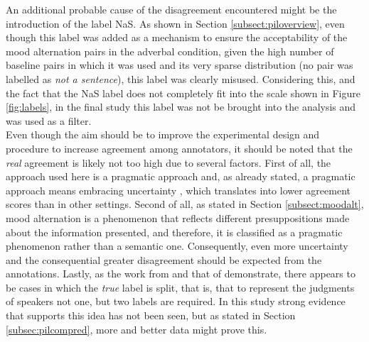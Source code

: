 An additional probable cause of the disagreement encountered might be the introduction of the label NaS. As shown in Section \ref{subsect:piloverview}, even though this label was added as a mechanism to ensure the acceptability of the mood alternation pairs in the adverbal condition, given the high number of baseline pairs in which it was used and its very sparse distribution (no pair was labelled as \textit{not a sentence}), this label was clearly misused. Considering this, and the fact that the NaS label does not completely fit into the scale shown in Figure \ref{fig:labels}, in the final study this label was not be brought into the analysis and was used as a filter.\\

Even though the aim should be to improve the experimental design and procedure to increase agreement among annotators, it should be noted that the \textit{real} agreement is likely not too high due to several factors. First of all, the approach used here is a pragmatic approach and, as already stated, a pragmatic approach means embracing uncertainty \citep{de2012did}, which translates into lower agreement scores than in other settings. Second of all, as stated in Section \ref{subsect:moodalt}, mood alternation is a phenomenon that reflects different presuppositions made about the information presented, and therefore, it is classified as a pragmatic phenomenon rather than a semantic one. Consequently, even more uncertainty and the consequential greater disagreement should be expected from the annotations. Lastly, as the work from \citet{de2012did} and that of \citet{pavlick2019inherent} demonstrate, there appears to be cases in which the \textit{true} label is split, that is, that to represent the judgments of speakers not one, but two labels are required. In this study strong evidence that supports this idea has not been seen, but as stated in Section \ref{subsec:pilcompred}, more and better data might prove this.\\

